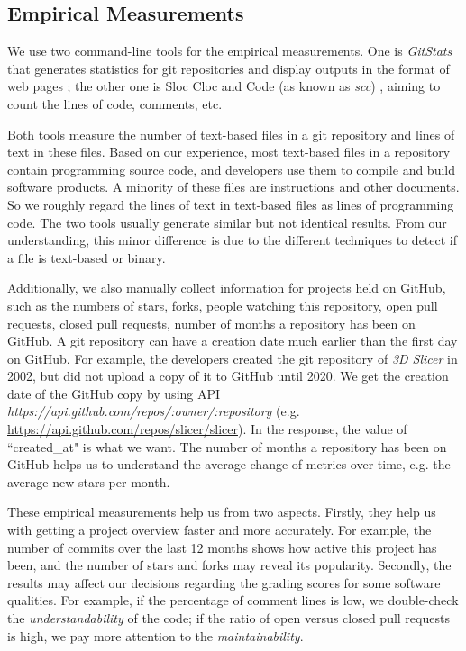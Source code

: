 \subsection{Empirical Measurements}
\label{sec_empirical_measurements}

We use two command-line tools for the empirical measurements. One is \textit{GitStats} that generates statistics for git repositories and display outputs in the format of web pages \cite{Gieniusz2019}; the other one is Sloc Cloc and Code (as known as \textit{scc}) \cite{Boyter2021}, aiming to count the lines of code, comments, etc.

Both tools measure the number of text-based files in a git repository and lines of text in these files. Based on our experience, most text-based files in a repository contain programming source code, and developers use them to compile and build software products. A minority of these files are instructions and other documents. So we roughly regard the lines of text in text-based files as lines of programming code. The two tools usually generate similar but not identical results. From our understanding, this minor difference is due to the different techniques to detect if a file is text-based or binary.

Additionally, we also manually collect information for projects held on GitHub, such as the numbers of stars, forks, people watching this repository, open pull requests, closed pull requests, number of months a repository has been on GitHub. A git repository can have a creation date much earlier than the first day on GitHub. For example, the developers created the git repository of \textit{3D Slicer} in 2002, but did not upload a copy of it to GitHub until 2020. We get the creation date of the GitHub copy by using API \textit{https://api.github.com/repos/{:owner}/{:repository}} (e.g. \hyperlink{https://api.github.com/repos/slicer/slicer}{https://api.github.com/repos/slicer/slicer}). In the response, the value of ``created\_at" is what we want. The number of months a repository has been on GitHub helps us to understand the average change of metrics over time, e.g. the average new stars per month. 

These empirical measurements help us from two aspects. Firstly, they help us with getting a project overview faster and more accurately. For example, the number of commits over the last 12 months shows how active this project has been, and the number of stars and forks may reveal its popularity. Secondly, the results may affect our decisions regarding the grading scores for some software qualities. For example, if the percentage of comment lines is low, we double-check the \textit{understandability} of the code; if the ratio of open versus closed pull requests is high, we pay more attention to the \textit{maintainability}.

